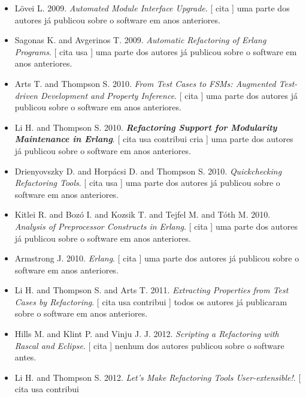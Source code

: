 \begin{itemize}
\item L\"{o}vei L.
      2009.
        \textit{ Automated Module Interface Upgrade}.
      [
          cita
      ]
uma parte dos autores já publicou sobre o software em anos anteriores.
\item Sagonas K. and Avgerinos T.
      2009.
        \textit{ Automatic Refactoring of Erlang Programs}.
      [
          cita
          usa
      ]
uma parte dos autores já publicou sobre o software em anos anteriores.
\item Arts T. and Thompson S.
      2010.
        \textit{ From Test Cases to FSMs: Augmented Test-driven Development and Property Inference}.
      [
          cita
      ]
uma parte dos autores já publicou sobre o software em anos anteriores.
\item Li H. and Thompson S.
      2010.
        \textbf{\textit{ Refactoring Support for Modularity Maintenance in Erlang}}.
      [
          cita
          usa
          contribui
          cria
      ]
uma parte dos autores já publicou sobre o software em anos anteriores.
\item Drienyovszky D. and Horp\'{a}csi D. and Thompson S.
      2010.
        \textit{ Quickchecking Refactoring Tools}.
      [
          cita
          usa
      ]
uma parte dos autores já publicou sobre o software em anos anteriores.
\item Kitlei R. and Boz\'{o} I. and Kozsik T. and Tejfel M. and T\'{o}th M.
      2010.
        \textit{ Analysis of Preprocessor Constructs in Erlang}.
      [
          cita
      ]
uma parte dos autores já publicou sobre o software em anos anteriores.
\item Armstrong J.
      2010.
        \textit{ Erlang}.
      [
          cita
      ]
uma parte dos autores já publicou sobre o software em anos anteriores.
\item Li H. and Thompson S. and Arts T.
      2011.
        \textit{ Extracting Properties from Test Cases by Refactoring}.
      [
          cita
          usa
          contribui
      ]
todos os autores já publicaram sobre o software em anos anteriores.
\item Hills M. and Klint P. and Vinju J. J.
      2012.
        \textit{ Scripting a Refactoring with Rascal and Eclipse}.
      [
          cita
      ]
nenhum dos autores publicou sobre o software antes.
\item Li H. and Thompson S.
      2012.
        \textit{ Let's Make Refactoring Tools User-extensible!}.
      [
          cita
          usa
          contribui

\end{itemize}
